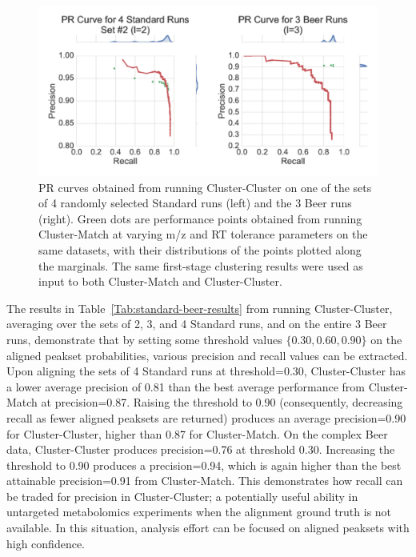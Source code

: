\begin{figure}[!htbp]
\centering
\includegraphics[width=1.0\linewidth]{05-precursor-cluster/figures/fig4.pdf}
\caption{\label{fig:pr-curve} PR curves obtained from running Cluster-Cluster on one of the sets of 4 randomly selected Standard runs (left) and the 3 Beer runs (right). Green dots are performance points obtained from running Cluster-Match at varying m/z and RT tolerance parameters on the same datasets, with their distributions of the points plotted along the marginals. The same first-stage clustering results were used as input to both Cluster-Match and Cluster-Cluster.}
\end{figure}

The results in Table~\ref{Tab:standard-beer-results} from running Cluster-Cluster, averaging over the sets of 2, 3, and 4 Standard runs, and on the entire 3 Beer runs, demonstrate that by setting some threshold values $\{0.30, 0.60, 0.90\}$ on the aligned peakset probabilities, various precision and recall values can be extracted. Upon aligning the sets of 4 Standard runs at threshold=0.30, Cluster-Cluster has a lower average precision of 0.81 than the best average performance from Cluster-Match at precision=0.87. Raising the threshold to 0.90 (consequently, decreasing recall as fewer aligned peaksets are returned) produces an average precision=0.90 for Cluster-Cluster, higher than 0.87 for Cluster-Match. On the complex Beer data, Cluster-Cluster produces precision=0.76 at threshold 0.30. Increasing the threshold to 0.90 produces a precision=0.94, which is again higher than the best attainable precision=0.91 from Cluster-Match. This demonstrates how recall can be traded for precision in Cluster-Cluster; a potentially useful ability in untargeted metabolomics experiments when the alignment ground truth is not available. In this situation, analysis effort can be focused on aligned peaksets with high confidence. 

